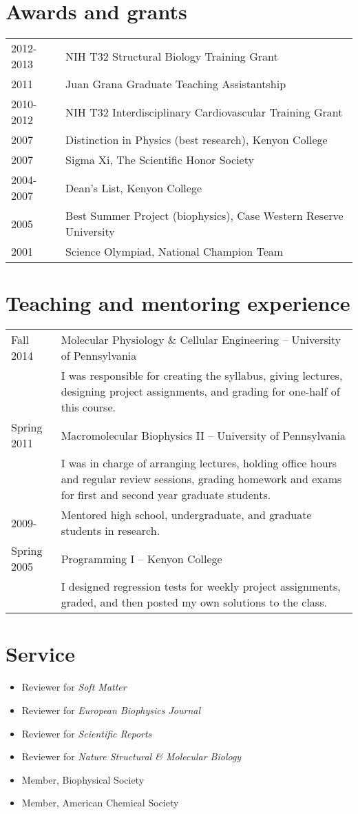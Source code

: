 \documentclass[letterpaper,11pt]{article}
\begin{document}
\section{Awards and grants}
\begin{tabular}{ll}
2012-2013 & NIH T32 Structural Biology Training Grant\\
2011 & Juan Grana Graduate Teaching Assistantship\\
2010-2012 & NIH T32 Interdisciplinary Cardiovascular Training Grant\\
2007 & Distinction in Physics (best research), Kenyon College\\
2007 & Sigma Xi, The Scientific Honor Society\\
2004-2007 & Dean's List, Kenyon College\\
2005 & Best Summer Project (biophysics), Case Western Reserve University\\
2001 & Science Olympiad, National Champion Team
\end{tabular}

\section{Teaching and mentoring experience}
\begin{tabular}{lp{16cm}}
Fall 2014 & Molecular Physiology \& Cellular Engineering -- University of Pennsylvania\\ & 
I was responsible for creating the syllabus, giving lectures, designing project assignments, 
and grading for one-half of this course.\\

Spring 2011 & Macromolecular Biophysics II -- University of
Pennsylvania\\ & I was in charge of arranging lectures, holding office
hours and regular review sessions, grading homework and exams for
first and second year graduate students.\\ 
2009- & Mentored high school, undergraduate, and graduate students in research. \\
Spring 2005 & Programming I
-- Kenyon College\\ & I designed regression tests for weekly project
assignments, graded, and then posted my own solutions to the class.
\end{tabular}

\section{Service}
\begin{itemize}
    \item Reviewer for \emph{Soft Matter}
    \item Reviewer for \emph{European Biophysics Journal}
    \item Reviewer for \emph{Scientific Reports}
    \item Reviewer for \emph{Nature Structural \& Molecular Biology}
    \item Member, Biophysical Society
    \item Member, American Chemical Society
\end{itemize}
\end{document}
